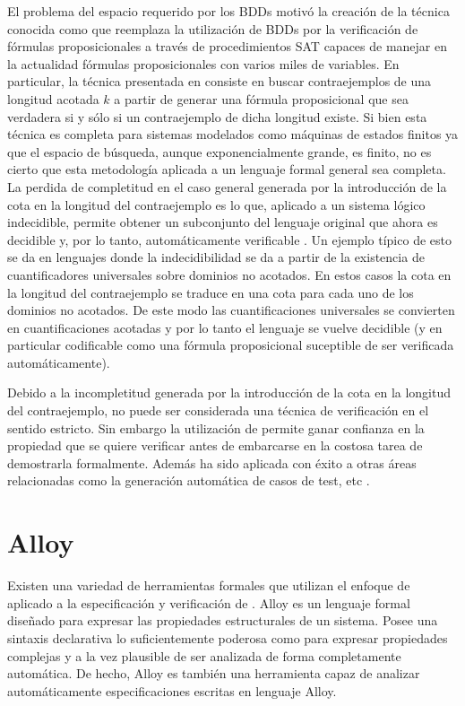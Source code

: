 El problema del espacio requerido por los BDDs motivó la creación de la técnica
conocida como \bmc\cite{Biere:1999:SMC:646483.691738} que reemplaza la
utilización de BDDs por la verificación de fórmulas proposicionales a través de
procedimientos SAT capaces de manejar en la actualidad fórmulas proposicionales
con varios miles de variables. En particular, la técnica presentada en
\cite{Biere:1999:SMC:646483.691738} consiste en buscar contraejemplos de una
longitud acotada $k$ a partir de generar una fórmula proposicional que sea
verdadera si y sólo si un contraejemplo de dicha longitud existe. Si bien esta
técnica es completa para sistemas modelados como máquinas de estados finitos ya
que el espacio de búsqueda, aunque exponencialmente grande, es finito, no es
cierto que esta metodología aplicada a un lenguaje formal general sea
completa. La perdida de completitud en el caso general
generada por la introducción de la cota en la longitud del contraejemplo es lo
que, aplicado a un sistema lógico indecidible, permite obtener un subconjunto
del lenguaje original que ahora es decidible y, por lo tanto, automáticamente
verificable . Un ejemplo típico de esto se da en lenguajes
donde la indecidibilidad se da a partir de la existencia de cuantificadores
universales sobre dominios no acotados. En estos casos la cota en la longitud
del contraejemplo se traduce en una cota para cada uno de los dominios no
acotados. De este modo las cuantificaciones universales se convierten en
cuantificaciones acotadas y por lo tanto el lenguaje se vuelve decidible (y en
particular codificable como una fórmula proposicional suceptible de ser
verificada automáticamente).

Debido a la incompletitud generada por la introducción de la cota en la longitud
del contraejemplo, \bmc no puede ser considerada una técnica de verificación en
el sentido estricto. Sin embargo la utilización de \bmc permite ganar confianza
en la propiedad que se quiere verificar antes de embarcarse en la costosa tarea
de demostrarla formalmente. Además \bmc ha sido aplicada con éxito a otras áreas
relacionadas como la generación automática de casos de test, etc .


\section{Alloy}

Existen una variedad de herramientas formales que utilizan el enfoque de \bmc
aplicado a la especificación y verificación de \soft. Alloy
\cite{jackson:acmtosem-11_2} es un lenguaje formal diseñado para expresar las
propiedades estructurales de un sistema. Posee una sintaxis declarativa lo
suficientemente poderosa como para expresar propiedades complejas y a la vez
plausible de ser analizada de forma completamente automática. De hecho, Alloy es
también una herramienta capaz de analizar automáticamente especificaciones
escritas en lenguaje Alloy.

